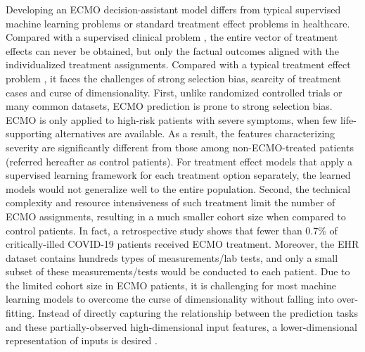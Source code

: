 Developing an ECMO decision-assistant model differs from typical supervised machine learning problems  or standard treatment effect problems in healthcare. Compared with a supervised clinical problem \cite{xue2021use,abraham2023integrating,jiao2022continuous,li2022self,shi2018obstructive,xue2022distance,xue2022validation,liu2022predicting}, the entire vector of treatment effects can never be obtained, but only the factual outcomes aligned with the individualized treatment assignments. Compared with a typical treatment effect problem \cite{spirtes2009tutorial,rubin}, it faces the challenges of strong selection bias, scarcity of treatment cases and curse of dimensionality. 
First, unlike randomized controlled trials or many common datasets, ECMO prediction is prone to strong selection bias. ECMO is only applied to high-risk patients with severe symptoms, when few life-supporting alternatives are available. As a result, the features characterizing severity are significantly different from those among non-ECMO-treated patients (referred hereafter as control patients). For treatment effect models that apply a supervised learning framework for each treatment option separately, the learned models would not generalize well to the entire population. Second, the technical complexity and resource intensiveness of such treatment limit the number of ECMO assignments, resulting in a much smaller cohort size when compared to control patients.  In fact, a retrospective study shows that fewer than 0.7\% of critically-illed COVID-19 patients received ECMO treatment\cite{bertini2021ecmo}. Moreover, the EHR dataset contains hundreds types of measurements/lab tests, and only a small subset of these measurements/tests would be conducted to each patient. Due to the limited cohort size in ECMO patients, it is challenging for most machine learning models to overcome the curse of dimensionality without falling into over-fitting. Instead of directly capturing the relationship between the prediction tasks and these partially-observed high-dimensional input features, a lower-dimensional representation of inputs is desired \cite{xuebingkdd}.  

